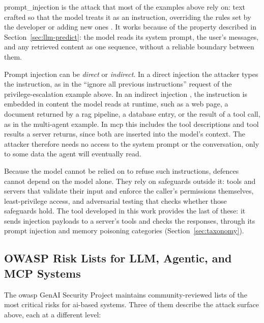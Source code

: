 \Gls{prompt_injection} is the attack that most of the examples above rely on: text crafted so that the model treats it as an instruction, overriding the rules set by the developer or adding new ones \citep{greshake2023prompt, liu2024universal}. It works because of the property described in Section~\ref{sec:llm-predict}: the model reads its system prompt, the user's messages, and any retrieved content as one sequence, without a reliable boundary between them.

Prompt injection can be \emph{direct} or \emph{indirect}. In a direct injection the attacker types the instruction, as in the ``ignore all previous instructions'' request of the privilege-escalation example above. In an indirect injection \citep{greshake2023prompt}, the instruction is embedded in content the model reads at runtime, such as a web page, a document returned by a \gls{rag} pipeline, a database entry, or the result of a tool call, as in the multi-agent example. In \gls{mcp} this includes the tool descriptions and tool results a server returns, since both are inserted into the model's context. The attacker therefore needs no access to the system prompt or the conversation, only to some data the agent will eventually read.

Because the model cannot be relied on to refuse such instructions, defences cannot depend on the model alone. They rely on safeguards outside it: tools and servers that validate their input and enforce the caller's permissions themselves, least-privilege access, and adversarial testing that checks whether those safeguards hold. The tool developed in this work provides the last of these: it sends injection payloads to a server's tools and checks the responses, through its prompt injection and memory poisoning categories (Section~\ref{sec:taxonomy}).

\subsection{OWASP Risk Lists for LLM, Agentic, and MCP Systems}
\label{sec:owasp}

The \gls{owasp} GenAI Security Project maintains community-reviewed lists of the most critical risks for \gls{ai}-based systems. Three of them describe the attack surface above, each at a different level:

